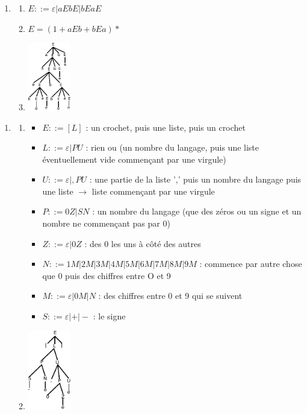\begin{enumerate}
	\item 
		\begin{enumerate}
			\item $E ::= \varepsilon | aEbE | bEaE$
			\item $E = (1 + aEb + bEa)*$
			\item \includegraphics[width=70px]{Images/fig15.pdf}
		\end{enumerate}
\end{enumerate}

\begin{enumerate}
	\item 
		\begin{enumerate}
		\item 
			\begin{itemize}
				\item $E ::= [L]$ : un crochet, puis une liste, puis un crochet
				\item $L ::= \varepsilon | PU$ : rien ou (un nombre du langage, puis une liste éventuellement vide commençant par une virgule)
				\item $U ::= \varepsilon | ,PU$ : une partie de la liste ',' puis un nombre du langage puis une liste $\rightarrow$ liste commençant par une virgule
				\item $P ::= 0Z | SN$ : un nombre du langage (que des zéros ou un signe et un nombre ne commençant pas par 0)
				\item $Z ::= \varepsilon | 0Z$ : des 0 les uns à côté des autres
				\item $N ::= 1M | 2M | 3M | 4M | 5M | 6M | 7M | 8M | 9M $ : commence par autre chose que 0 puis des chiffres entre O et 9
				\item $M ::= \varepsilon | 0M | N$ : des chiffres entre 0 et 9 qui se suivent
				\item $S ::= \varepsilon | + | -$ : le signe
			\end{itemize}
		\item \includegraphics[width=70px]{Images/fig16.pdf}
		\end{enumerate}


\end{enumerate}
